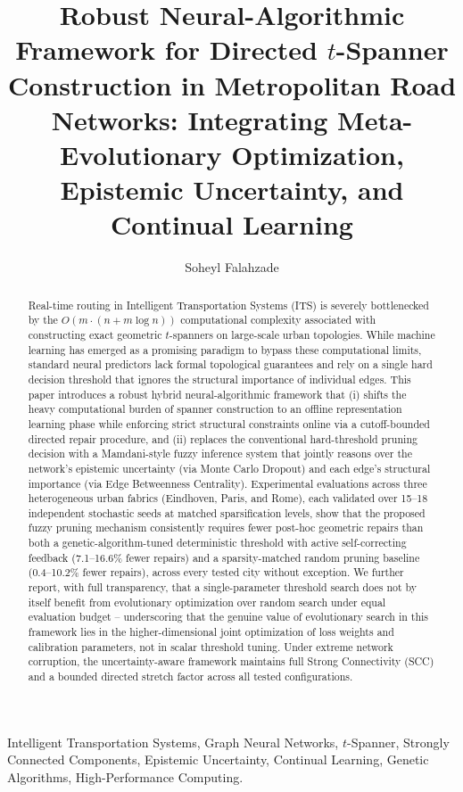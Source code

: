 \documentclass[journal]{IEEEtran}
\title{Robust Neural-Algorithmic Framework for Directed $t$-Spanner Construction in Metropolitan Road Networks: Integrating Meta-Evolutionary Optimization, Epistemic Uncertainty, and Continual Learning}
\author{Soheyl Falahzade}
\begin{document}
\maketitle

\begin{abstract}
Real-time routing in Intelligent Transportation Systems (ITS) is severely bottlenecked by the $O(m \cdot (n + m \log n))$ computational complexity associated with constructing exact geometric $t$-spanners on large-scale urban topologies. While machine learning has emerged as a promising paradigm to bypass these computational limits, standard neural predictors lack formal topological guarantees and rely on a single hard decision threshold that ignores the structural importance of individual edges. This paper introduces a robust hybrid neural-algorithmic framework that (i) shifts the heavy computational burden of spanner construction to an offline representation learning phase while enforcing strict structural constraints online via a cutoff-bounded directed repair procedure, and (ii) replaces the conventional hard-threshold pruning decision with a Mamdani-style fuzzy inference system that jointly reasons over the network's epistemic uncertainty (via Monte Carlo Dropout) and each edge's structural importance (via Edge Betweenness Centrality). Experimental evaluations across three heterogeneous urban fabrics (Eindhoven, Paris, and Rome), each validated over 15--18 independent stochastic seeds at matched sparsification levels, show that the proposed fuzzy pruning mechanism consistently requires fewer post-hoc geometric repairs than both a genetic-algorithm-tuned deterministic threshold with active self-correcting feedback (7.1--16.6\% fewer repairs) and a sparsity-matched random pruning baseline (0.4--10.2\% fewer repairs), across every tested city without exception. We further report, with full transparency, that a single-parameter threshold search does not by itself benefit from evolutionary optimization over random search under equal evaluation budget -- underscoring that the genuine value of evolutionary search in this framework lies in the higher-dimensional joint optimization of loss weights and calibration parameters, not in scalar threshold tuning. Under extreme network corruption, the uncertainty-aware framework maintains full Strong Connectivity (SCC) and a bounded directed stretch factor across all tested configurations.
\end{abstract}

\begin{IEEEkeywords}
Intelligent Transportation Systems, Graph Neural Networks, $t$-Spanner, Strongly Connected Components, Epistemic Uncertainty, Continual Learning, Genetic Algorithms, High-Performance Computing.
\end{IEEEkeywords}
\end{document}
